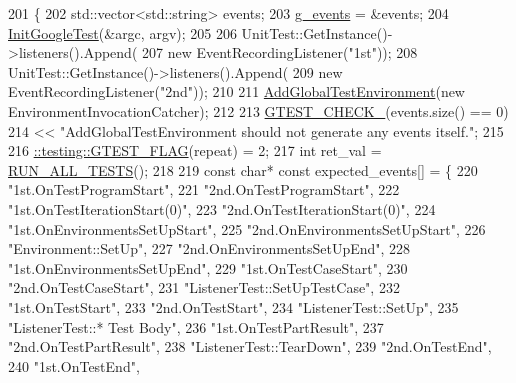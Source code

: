 \begin{DoxyCode}
201                                 \{
202   std::vector<std::string> events;
203   \hyperlink{gtest-listener__test_8cc_a32a264046f3603db11e6fcdaea5fb094}{g\_events} = &events;
204   \hyperlink{namespacetesting_afd726ae08c9bd16dc52f78c822d9946b}{InitGoogleTest}(&argc, argv);
205 
206   UnitTest::GetInstance()->listeners().Append(
207       \textcolor{keyword}{new} EventRecordingListener(\textcolor{stringliteral}{"1st"}));
208   UnitTest::GetInstance()->listeners().Append(
209       \textcolor{keyword}{new} EventRecordingListener(\textcolor{stringliteral}{"2nd"}));
210 
211   \hyperlink{namespacetesting_a460d7b998622e332392c1e00be3a60d5}{AddGlobalTestEnvironment}(\textcolor{keyword}{new} EnvironmentInvocationCatcher);
212 
213   \hyperlink{gtest-port_8h_ab54343f0a36dc4cb0ce8a478dd7847b8}{GTEST\_CHECK\_}(events.size() == 0)
214       << \textcolor{stringliteral}{"AddGlobalTestEnvironment should not generate any events itself."};
215 
216   \hyperlink{gtest-port_8h_a828f4e34a1c4b510da50ec1563e3562a}{::testing::GTEST\_FLAG}(repeat) = 2;
217   \textcolor{keywordtype}{int} ret\_val = \hyperlink{gtest_8h_a853a3792807489591d3d4a2f2ff9359f}{RUN\_ALL\_TESTS}();
218 
219   \textcolor{keyword}{const} \textcolor{keywordtype}{char}* \textcolor{keyword}{const} expected\_events[] = \{
220     \textcolor{stringliteral}{"1st.OnTestProgramStart"},
221     \textcolor{stringliteral}{"2nd.OnTestProgramStart"},
222     \textcolor{stringliteral}{"1st.OnTestIterationStart(0)"},
223     \textcolor{stringliteral}{"2nd.OnTestIterationStart(0)"},
224     \textcolor{stringliteral}{"1st.OnEnvironmentsSetUpStart"},
225     \textcolor{stringliteral}{"2nd.OnEnvironmentsSetUpStart"},
226     \textcolor{stringliteral}{"Environment::SetUp"},
227     \textcolor{stringliteral}{"2nd.OnEnvironmentsSetUpEnd"},
228     \textcolor{stringliteral}{"1st.OnEnvironmentsSetUpEnd"},
229     \textcolor{stringliteral}{"1st.OnTestCaseStart"},
230     \textcolor{stringliteral}{"2nd.OnTestCaseStart"},
231     \textcolor{stringliteral}{"ListenerTest::SetUpTestCase"},
232     \textcolor{stringliteral}{"1st.OnTestStart"},
233     \textcolor{stringliteral}{"2nd.OnTestStart"},
234     \textcolor{stringliteral}{"ListenerTest::SetUp"},
235     \textcolor{stringliteral}{"ListenerTest::* Test Body"},
236     \textcolor{stringliteral}{"1st.OnTestPartResult"},
237     \textcolor{stringliteral}{"2nd.OnTestPartResult"},
238     \textcolor{stringliteral}{"ListenerTest::TearDown"},
239     \textcolor{stringliteral}{"2nd.OnTestEnd"},
240     \textcolor{stringliteral}{"1st.OnTestEnd"},

\end{DoxyCode}
